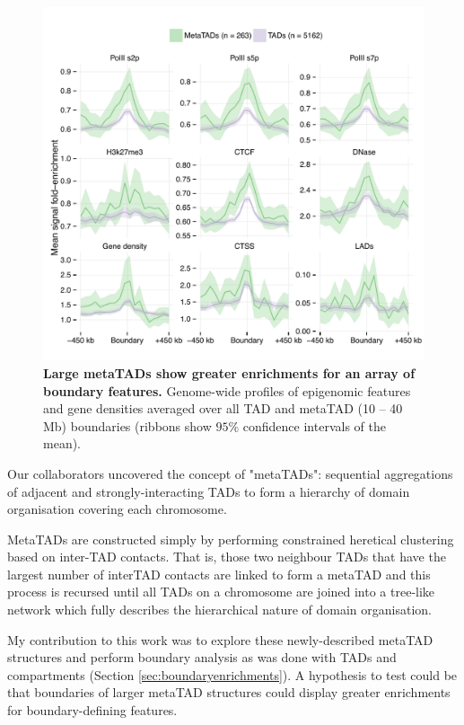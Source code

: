 \documentclass[a4paper,10pt,oneside]{book}
\begin{document}
\begin{figure}
\begin{center} 
\includegraphics[width=.9\textwidth]{figs/mt_feats.pdf}
\captionsetup{width=\textwidth}
\caption{ {\bf Large metaTADs show greater enrichments for an array of boundary features.}
Genome-wide profiles of epigenomic features and gene densities averaged over all TAD and metaTAD (10 -- 40 Mb) boundaries (ribbons show $95\%$ confidence intervals of the mean).
}\label{fig:mtfeats}
\end{center}
\end{figure} 

Our collaborators uncovered the concept of "metaTADs": sequential aggregations of adjacent and strongly-interacting TADs to form a hierarchy of domain organisation covering each chromosome.

MetaTADs are constructed simply by performing constrained heretical clustering based on inter-TAD contacts. That is, those two neighbour TADs that have the largest number of interTAD contacts are linked to form a metaTAD and this process is recursed until all TADs on a chromosome are joined into a tree-like network which fully describes the hierarchical nature of domain organisation.

My contribution to this work was to explore these newly-described metaTAD structures and perform boundary analysis as was done with TADs and compartments (Section \ref{sec:boundaryenrichments}). A hypothesis to test could be that boundaries of larger metaTAD structures could display greater enrichments for boundary-defining features.
\end{document}
